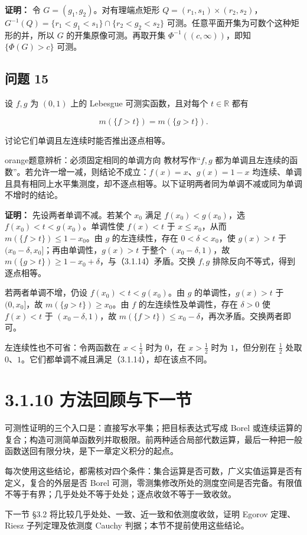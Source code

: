 \documentclass[11pt,a4paper]{article}
\begin{document}
\textbf{证明：} 令 \(G=(g_1,g_2)\)。对有理端点矩形
\(Q=(r_1,s_1)\times(r_2,s_2)\)，\(G^{-1}(Q)=\{r_1<g_1<s_1\}\cap\{r_2<g_2<s_2\}\)
可测。任意平面开集为可数个这种矩形的并，所以 \(G\)
的开集原像可测。再取开集 \(\Phi^{-1}((c,\infty))\)，即知
\(\{\Phi(G)>c\}\) 可测。

\subsection{问题 15}\label{ux95eeux9898-15}

设 \(f,g\) 为 \((0,1)\) 上的 Lebesgue 可测实函数，且对每个
\(t\in\mathbb R\) 都有

\begin{equation*}
m(\{f>t\})=m(\{g>t\}).
\tag{3.1.14}
\end{equation*}

讨论它们单调且左连续时能否推出逐点相等。

\begin{sboxenv}{orange}{题意辨析：必须固定相同的单调方向}
教材写作``\(f,g\)
都为单调且左连续的函数''。若允许一增一减，则结论不成立：\(f(x)=x\)、\(g(x)=1-x\)
均连续、单调且具有相同上水平集测度，却不逐点相等。以下证明两者同为单调不减或同为单调不增时的结论。

\end{sboxenv}

\textbf{证明：} 先设两者单调不减。若某个 \(x_0\) 满足
\(f(x_0)<g(x_0)\)，选 \(f(x_0)<t<g(x_0)\)。单调性使 \(f(x)<t\) 于
\(x\le x_0\)，从而 \(m(\{f>t\})\le1-x_0\)。由 \(g\) 的左连续性，存在
\(0<\delta<x_0\)，使 \(g(x)>t\) 于
\((x_0-\delta,x_0]\)；再由单调性，\(g(x)>t\) 于整个
\((x_0-\delta,1)\)，故
\(m(\{g>t\})\ge1-x_0+\delta\)，与（3.1.14）矛盾。交换 \(f,g\)
排除反向不等式，得到逐点相等。

若两者单调不增，仍设 \(f(x_0)<t<g(x_0)\)。由 \(g\) 的单调性，\(g(x)>t\)
于 \((0,x_0]\)，故 \(m(\{g>t\})\ge x_0\)。由 \(f\)
的左连续性及单调性，存在 \(\delta>0\) 使 \(f(x)<t\) 于
\((x_0-\delta,1)\)，故
\(m(\{f>t\})\le x_0-\delta\)，再次矛盾。交换两者即可。

左连续性也不可省：令两函数在 \(x<\frac12\) 时为 \(0\)，在 \(x>\frac12\)
时为 \(1\)，但分别在 \(\frac12\) 处取
\(0\)、\(1\)。它们都单调不减且满足（3.1.14），却在该点不同。

\section[\S{}3.1.10
方法回顾与下一节]{3.1.10
方法回顾与下一节}\label{ux65b9ux6cd5ux56deux987eux4e0eux4e0bux4e00ux8282}

可测性证明的三个入口是：直接写水平集；把目标表达式写成 Borel
或连续运算的复合；构造可测简单函数列并取极限。前两种适合局部代数运算，最后一种把一般函数送回有限分块，是下一章定义积分的起点。

每次使用这些结论，都需核对四个条件：集合运算是否可数，广义实值运算是否有定义，复合的外层是否
Borel
可测，零测集修改所处的测度空间是否完备。有限值不等于有界；几乎处处不等于处处；逐点收敛不等于一致收敛。

下一节 §3.2 将比较几乎处处、一致、近一致和依测度收敛，证明 Egorov
定理、Riesz 子列定理及依测度 Cauchy 判据；本节不提前使用这些结论。
\end{document}
